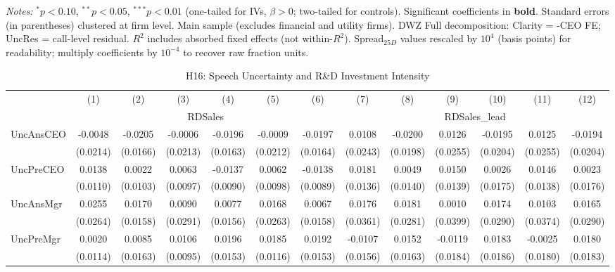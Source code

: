 \documentclass[11pt,a4paper]{article}
\begin{document}
\begin{table}[htbp]
\begin{minipage}{\linewidth}
\vspace{2pt}\scriptsize
\textit{Notes:} $^{*}p<0.10$, $^{**}p<0.05$, $^{***}p<0.01$ (one-tailed for IVs, $\beta > 0$; two-tailed for controls).
 Significant coefficients in \textbf{bold}.
 Standard errors (in parentheses) clustered at firm level.
 Main sample (excludes financial and utility firms). DWZ Full decomposition: Clarity = -CEO FE; UncRes = call-level residual.
 $R^2$ includes absorbed fixed effects (not within-$R^2$).
 Spread$_{25D}$ values rescaled by $10^4$ (basis points) for readability; multiply coefficients by $10^{-4}$ to recover raw fraction units.
\end{minipage}
\end{table}
\clearpage
\begin{table}[htbp]
\centering
\caption{H16: Speech Uncertainty and R\&D Investment Intensity}
\label{tab:h16}
\scriptsize
\begin{tabular}{lcccccccccccc}
\toprule
 & (1) & (2) & (3) & (4) & (5) & (6) & (7) & (8) & (9) & (10) & (11) & (12) \\
 & \multicolumn{6}{c}{RDSales} & \multicolumn{6}{c}{RDSales\_lead} \\
\cmidrule(lr){2-7} \cmidrule(lr){8-13}
\midrule
UncAnsCEO & -0.0048 & -0.0205 & -0.0006 & -0.0196 & -0.0009 & -0.0197 & 0.0108 & -0.0200 & 0.0126 & -0.0195 & 0.0125 & -0.0194 \\
 & (0.0214) & (0.0166) & (0.0213) & (0.0163) & (0.0212) & (0.0164) & (0.0243) & (0.0198) & (0.0255) & (0.0204) & (0.0255) & (0.0204) \\
UncPreCEO & 0.0138 & 0.0022 & 0.0063 & -0.0137 & 0.0062 & -0.0138 & 0.0181 & 0.0049 & 0.0150 & 0.0026 & 0.0146 & 0.0023 \\
 & (0.0110) & (0.0103) & (0.0097) & (0.0090) & (0.0098) & (0.0089) & (0.0136) & (0.0140) & (0.0139) & (0.0175) & (0.0138) & (0.0176) \\
UncAnsMgr & 0.0255 & 0.0170 & 0.0090 & 0.0077 & 0.0168 & 0.0067 & 0.0176 & 0.0181 & 0.0010 & 0.0174 & 0.0103 & 0.0165 \\
 & (0.0264) & (0.0158) & (0.0291) & (0.0156) & (0.0263) & (0.0158) & (0.0361) & (0.0281) & (0.0399) & (0.0290) & (0.0374) & (0.0290) \\
UncPreMgr & 0.0020 & 0.0085 & 0.0106 & 0.0196 & 0.0185 & 0.0192 & -0.0107 & 0.0152 & -0.0119 & 0.0183 & -0.0025 & 0.0180 \\
 & (0.0114) & (0.0163) & (0.0095) & (0.0153) & (0.0116) & (0.0153) & (0.0156) & (0.0163) & (0.0184) & (0.0186) & (0.0180) & (0.0183) \\

\end{tabular}
\end{table}
\end{document}
